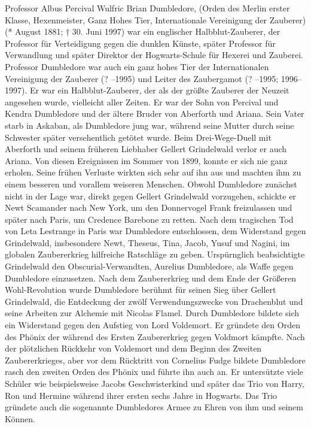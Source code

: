 \documentclass[a4paper, 10pt]{article}
\begin{document}
Professor Albus Percival Wulfric Brian Dumbledore, (Orden des Merlin erster Klasse, Hexenmeister, Ganz Hohes Tier, Internationale Vereinigung der Zauberer) (* August 1881; † 30. Juni 1997) war ein englischer Halbblut-Zauberer, der Professor für Verteidigung gegen die dunklen Künste, später Professor für Verwandlung und später Direktor der Hogwarts-Schule für Hexerei und Zauberei. Professor Dumbledore war auch ein ganz hohes Tier der Internationalen Vereinigung der Zauberer (? –1995) und Leiter des Zaubergamot (? –1995; 1996–1997). Er war ein Halbblut-Zauberer, der als der größte Zauberer der Neuzeit angesehen wurde, vielleicht aller Zeiten. Er war der Sohn von Percival und Kendra Dumbledore und der ältere Bruder von Aberforth und Ariana. Sein Vater starb in Askaban, als Dumbledore jung war, während seine Mutter durch seine Schwester später versehentlich getötet wurde. Beim Drei-Wege-Duell mit Aberforth und seinem früheren Liebhaber Gellert Grindelwald verlor er auch Ariana. Von diesen Ereignissen im Sommer von 1899, konnte er sich nie ganz erholen. Seine frühen Verluste wirkten sich sehr auf ihn aus und machten ihm zu einem besseren und vorallem weiseren Menschen.
\vspace{10pt}
\newline
{}  
Obwohl Dumbledore zunächst nicht in der Lage war, direkt gegen Gellert Grindelwald vorzugehen, schickte er Newt Scamander nach New York, um den Donnervogel Frank freizulassen und später nach Paris, um Credence Barebone zu retten. Nach dem tragischen Tod von Leta Lestrange in Paris war Dumbledore entschlossen, dem Widerstand gegen Grindelwald, insbesondere Newt, Theseus, Tina, Jacob, Yusuf und Nagini, im globalen Zaubererkrieg hilfreiche Ratschläge zu geben. Urspürnglich beabsichtigte Grindelwald den Obscurial-Verwandten, Aurelius Dumbledore, als Waffe gegen Dumbledore einzusetzen.
\vspace{10pt}
\newline
{}  
Nach dem Zaubererkrieg und dem Ende der Größeren Wohl-Revolution wurde Dumbledore berühmt für seinen Sieg über Gellert Grindelwald, die Entdeckung der zwölf Verwendungszwecke von Drachenblut und seine Arbeiten zur Alchemie mit Nicolas Flamel.
\vspace{10pt}
\newline
{}  
Durch Dumbledore bildete sich ein Widerstand gegen den Aufstieg von Lord Voldemort. Er gründete den Orden des Phönix der während des Ersten Zaubererkrieg gegen Voldmort kämpfte. Nach der plötzlichen Rückkehr von Voldemort und dem Beginn des Zweiten Zaubererkrieges, aber vor dem Rücktritt von Cornelius Fudge bildete Dumbledore rasch den zweiten Orden des Phönix und führte ihn auch an. Er untersützte viele Schüler wie beispielsweise Jacobs Geschwisterkind und später das Trio von Harry, Ron und Hermine während ihrer ersten sechs Jahre in Hogwarts. Das Trio gründete auch die sogenannte Dumbledores Armee zu Ehren von ihm und seinem Können.
\end{document}
